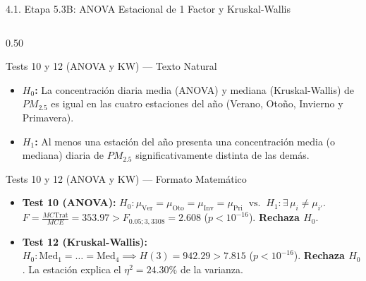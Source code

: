 \documentclass[aspectratio=169, 9pt]{beamer}
\begin{document}
\begin{frame}{4.1. Etapa 5.3B: ANOVA Estacional de 1 Factor y Kruskal-Wallis}
\begin{columns}[T]
  \begin{column}{0.50\textwidth}
    \begin{alertblock}{\footnotesize Tests 10 y 12 (ANOVA y KW) — Texto Natural}
      \scriptsize
      \begin{itemize}\setlength{\itemsep}{1pt}
        \item \textbf{$H_0$:} La concentración diaria media (ANOVA) y mediana (Kruskal-Wallis) de $PM_{2.5}$ es igual en las cuatro estaciones del año (Verano, Otoño, Invierno y Primavera).
        \item \textbf{$H_1$:} Al menos una estación del año presenta una concentración media (o mediana) diaria de $PM_{2.5}$ significativamente distinta de las demás.
      \end{itemize}
    \end{alertblock}

    \begin{exampleblock}{\footnotesize Tests 10 y 12 (ANOVA y KW) — Formato Matemático}
      \scriptsize
      \begin{itemize}\setlength{\itemsep}{1pt}
        \item \textbf{Test 10 (ANOVA):} $H_0: \mu_{\text{Ver}} = \mu_{\text{Oto}} = \mu_{\text{Inv}} = \mu_{\text{Pri}} \;\;\text{vs.}\;\; H_1: \exists\,\mu_i \neq \mu_{i'}$.\\
        $F = \frac{MC\text{Trat}}{MCE} = \mathbf{353.97} > F_{0.05; 3, 3308} = 2.608$ ($p < 10^{-16}$). \textbf{Rechaza $H_0$}.
        \item \textbf{Test 12 (Kruskal-Wallis):} $H_0: \text{Med}_1=\dots=\text{Med}_4 \implies H(3) = \mathbf{942.29} > 7.815$ ($p < 10^{-16}$). \textbf{Rechaza $H_0$}. La estación explica el $\eta^2 = \mathbf{24.30\%}$ de la varianza.
      \end{itemize}
    \end{exampleblock}
  \end{column}
\end{columns}
\end{frame}
\end{document}
